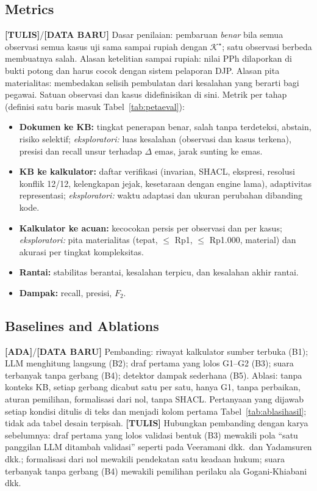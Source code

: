 \documentclass{ieeeaccess}
\newcommand{\ADA}{\textcolor{stada}{\textbf{[ADA]}}}
\newcommand{\TULIS}{\textcolor{sttulis}{\textbf{[TULIS]}}}
\newcommand{\BARU}{\textcolor{stbaru}{\textbf{[DATA BARU]}}}
\newenvironment{isi}{\par\smallskip\footnotesize\color{draftblue}\noindent}{\par\smallskip\normalsize\color{black}}
\begin{document}
\subsection{Metrics}
\begin{isi}
\TULIS{}/\BARU{} Dasar penilaian: pembaruan \emph{benar} bila semua observasi semua kasus uji sama sampai rupiah dengan $\mathcal{K}^\star$; satu observasi berbeda membuatnya salah. Alasan ketelitian sampai rupiah: nilai PPh dilaporkan di bukti potong dan harus cocok dengan sistem pelaporan DJP. Alasan pita materialitas: membedakan selisih pembulatan dari kesalahan yang berarti bagi pegawai. Satuan observasi dan kasus didefinisikan di sini. Metrik per tahap (definisi satu baris masuk Tabel~\ref{tab:petaeval}):
\begin{itemize}
\item \textbf{Dokumen ke KB:} tingkat penerapan benar, salah tanpa terdeteksi, abstain, risiko selektif; \emph{eksploratori:} luas kesalahan (observasi dan kasus terkena), presisi dan recall unsur terhadap $\Delta$ emas, jarak sunting ke emas.
\item \textbf{KB ke kalkulator:} daftar verifikasi (invarian, SHACL, ekspresi, resolusi konflik 12/12, kelengkapan jejak, kesetaraan dengan engine lama), adaptivitas representasi; \emph{eksploratori:} waktu adaptasi dan ukuran perubahan dibanding kode.
\item \textbf{Kalkulator ke acuan:} kecocokan persis per observasi dan per kasus; \emph{eksploratori:} pita materialitas (tepat, $\le$ Rp1, $\le$ Rp1.000, material) dan akurasi per tingkat kompleksitas.
\item \textbf{Rantai:} stabilitas berantai, kesalahan terpicu, dan kesalahan akhir rantai.
\item \textbf{Dampak:} recall, presisi, $F_2$.
\end{itemize}
\end{isi}

\subsection{Baselines and Ablations}
\begin{isi}
\ADA{}/\BARU{} Pembanding: riwayat kalkulator sumber terbuka (B1); LLM menghitung langsung (B2); draf pertama yang lolos G1--G2 (B3); suara terbanyak tanpa gerbang (B4); detektor dampak sederhana (B5). Ablasi: tanpa konteks KB, setiap gerbang dicabut satu per satu, hanya G1, tanpa perbaikan, aturan pemilihan, formalisasi dari nol, tanpa SHACL. Pertanyaan yang dijawab setiap kondisi ditulis di teks dan menjadi kolom pertama Tabel~\ref{tab:ablasihasil}; tidak ada tabel desain terpisah. \TULIS{} Hubungkan pembanding dengan karya sebelumnya: draf pertama yang lolos validasi bentuk (B3) mewakili pola ``satu panggilan LLM ditambah validasi'' seperti pada Veeramani dkk.\ dan Yadamsuren dkk.; formalisasi dari nol mewakili pendekatan satu keadaan hukum; suara terbanyak tanpa gerbang (B4) mewakili pemilihan perilaku ala Gogani-Khiabani dkk.
\end{isi}
\end{document}
